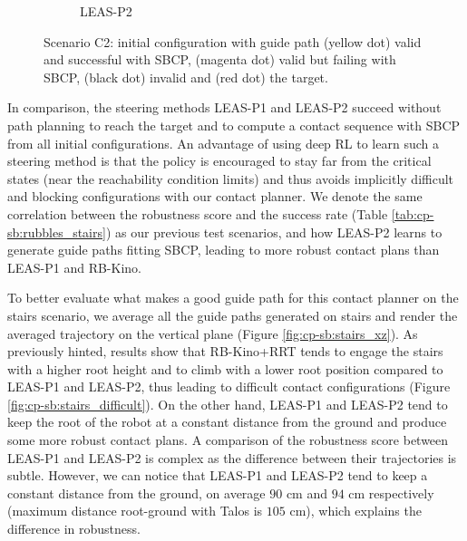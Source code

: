 \begin{figure}[ht]
\begin{subfigure}[t]{0.48\linewidth}
        \caption{LEAS-P2}
    \end{subfigure}
    \caption{Scenario C2: initial configuration with guide path (yellow dot) valid and successful with SBCP, (magenta dot) valid but failing with SBCP, (black dot) invalid and (red dot) the target.}
    \label{fig:cp-sb:stairs_sm}
\end{figure}

In comparison, the steering methods LEAS-P1 and LEAS-P2 succeed without path planning to reach the target and to compute a contact sequence with SBCP from all initial configurations.
An advantage of using deep RL to learn such a steering method is that the policy is encouraged to stay far from the critical states (near the reachability condition limits) and thus avoids implicitly difficult and blocking configurations with our contact planner.
We denote the same correlation between the robustness score and the success rate (Table \ref{tab:cp-sb:rubbles_stairs}) as our previous test scenarios, and how LEAS-P2 learns to generate guide paths fitting SBCP, leading to more robust contact plans than LEAS-P1 and RB-Kino.

To better evaluate what makes a good guide path for this contact planner on the stairs scenario, we average all the guide paths generated on stairs and render the averaged trajectory on the vertical plane (Figure \ref{fig:cp-sb:stairs_xz}).
As previously hinted, results show that RB-Kino+RRT tends to engage the stairs with a higher root height and to climb with a lower root position compared to LEAS-P1 and LEAS-P2, thus leading to difficult contact configurations (Figure \ref{fig:cp-sb:stairs_difficult}).
On the other hand, LEAS-P1 and LEAS-P2 tend to keep the root of the robot at a constant distance from the ground and produce some more robust contact plans.
A comparison of the robustness score between LEAS-P1 and LEAS-P2 is complex as the difference between their trajectories is subtle. 
However, we can notice that LEAS-P1 and LEAS-P2 tend to keep a constant distance from the ground, on average $90$ cm and $94$ cm respectively (maximum distance root-ground with Talos is $105$ cm), which explains the difference in robustness.


